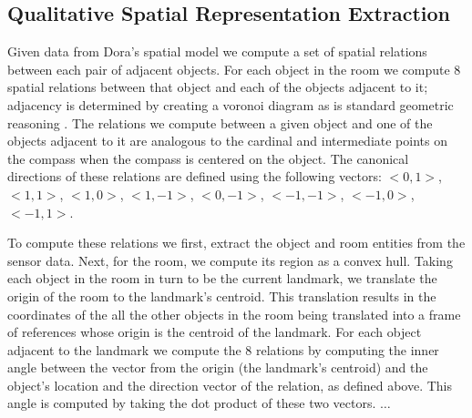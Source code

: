 \subsection{Qualitative Spatial Representation Extraction}

Given data from Dora's spatial model we compute a set of spatial relations between each pair of adjacent objects. For each object in the room we compute 8 spatial relations between that object and each of the objects adjacent to it; adjacency is determined by creating a voronoi diagram as is standard geometric reasoning \cite{Forbus/etal2003}. The relations we compute between a given object and one of the objects adjacent to it are analogous to the cardinal and intermediate points on the compass when the compass is centered on the object. The canonical directions of these relations are defined using the following vectors: $<0,1>$, $<1,1>$, $<1,0>$, $<1,-1>$, $<0,-1>$, $<-1,-1>$, $<-1,0>$, $<-1,1>$.

To compute these relations we first, extract the object and room entities from the sensor data. Next, for the room, we compute its region as a convex hull. Taking each object in the room in turn to be the current landmark, we translate the origin of the room to the landmark's centroid. This translation results in the coordinates of the all the other objects in the room being translated into a frame of references whose origin is the centroid of the landmark.  For each object adjacent to the landmark we compute the 8 relations by computing the inner angle between the vector from the origin (the landmark's centroid) and the object's location and the direction vector of the relation, as defined above. This angle is computed by taking the dot product of these two vectors. $\dots$




